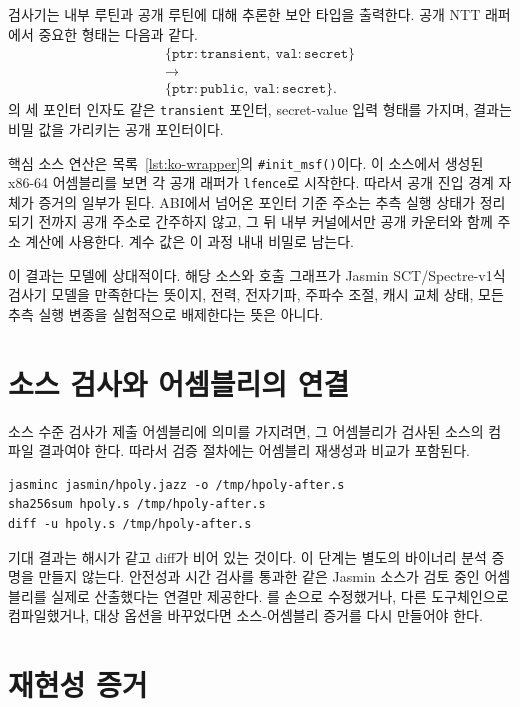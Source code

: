 \documentclass[10pt,twocolumn]{article}
\newcommand{\jasmin}{Jasmin}
\begin{document}
검사기는 내부 루틴과 공개 루틴에 대해 추론한 보안 타입을 출력한다. 공개
NTT 래퍼에서 중요한 형태는 다음과 같다.
\[
\begin{array}{c}
\{\texttt{ptr}:\texttt{transient},\ \texttt{val}:\texttt{secret}\}\\
\to\\
\{\texttt{ptr}:\texttt{public},\ \texttt{val}:\texttt{secret}\}.
\end{array}
\]
의 세 포인터 인자도 같은 \texttt{transient} 포인터,
secret-value 입력 형태를 가지며, 결과는 비밀 값을 가리키는 공개
포인터이다.

핵심 소스 연산은 목록~\ref{lst:ko-wrapper}의 \texttt{\#init\_msf()}이다.
이 소스에서 생성된 x86-64 어셈블리를 보면 각 공개 래퍼가 \texttt{lfence}로
시작한다. 따라서 공개 진입 경계 자체가 증거의 일부가 된다. ABI에서 넘어온
포인터 기준 주소는 추측 실행 상태가 정리되기 전까지 공개 주소로 간주하지
않고, 그 뒤 내부 커널에서만 공개 카운터와 함께 주소 계산에 사용한다. 계수
값은 이 과정 내내 비밀로 남는다.

이 결과는 모델에 상대적이다. 해당 소스와 호출 그래프가 \jasmin{}
SCT/Spectre-v1식 검사기 모델을 만족한다는 뜻이지, 전력, 전자기파, 주파수
조절, 캐시 교체 상태, 모든 추측 실행 변종을 실험적으로 배제한다는 뜻은
아니다.

\section{소스 검사와 어셈블리의 연결}

소스 수준 검사가 제출 어셈블리에 의미를 가지려면, 그 어셈블리가 검사된
소스의 컴파일 결과여야 한다. 따라서 검증 절차에는 어셈블리 재생성과 비교가 포함된다.

\begin{lstlisting}[language=Shell,caption={어셈블리 재생성과 비교.},label={lst:ko-asmcmd}]
jasminc jasmin/hpoly.jazz -o /tmp/hpoly-after.s
sha256sum hpoly.s /tmp/hpoly-after.s
diff -u hpoly.s /tmp/hpoly-after.s
\end{lstlisting}

기대 결과는 해시가 같고 diff가 비어 있는 것이다. 이 단계는 별도의
바이너리 분석 증명을 만들지 않는다. 안전성과 시간 검사를 통과한 같은
\jasmin{} 소스가 검토 중인 어셈블리를 실제로 산출했다는 연결만 제공한다.
를 손으로 수정했거나, 다른 도구체인으로 컴파일했거나,
대상 옵션을 바꾸었다면 소스-어셈블리 증거를 다시 만들어야 한다.

\section{재현성 증거}
\end{document}
